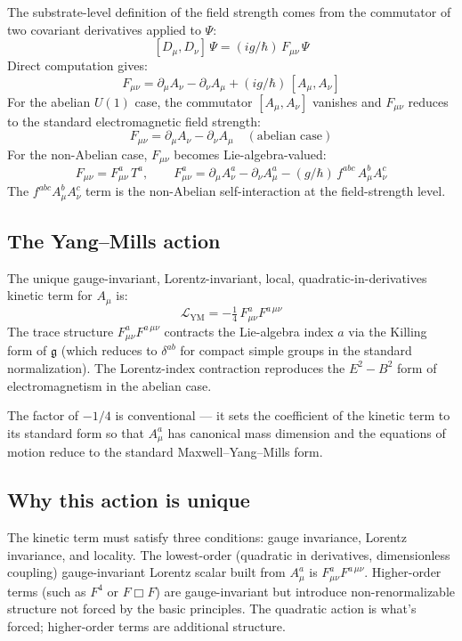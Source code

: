 \documentclass[11pt,a4paper]{article}
\begin{document}
The substrate-level definition of the field strength comes from the commutator of two covariant derivatives applied to $\Psi$:
\[
[D_\mu, D_\nu]\, \Psi = (ig/\hbar)\, F_{\mu\nu}\, \Psi
\]
Direct computation gives:
\[
F_{\mu\nu} = \partial_\mu A_\nu - \partial_\nu A_\mu + (ig/\hbar)\, [A_\mu, A_\nu]
\]
For the abelian $U(1)$ case, the commutator $[A_\mu, A_\nu]$ vanishes and $F_{\mu\nu}$ reduces to the standard electromagnetic field strength:
\[
F_{\mu\nu} = \partial_\mu A_\nu - \partial_\nu A_\mu \quad (\text{abelian case})
\]
For the non-Abelian case, $F_{\mu\nu}$ becomes Lie-algebra-valued:
\[
F_{\mu\nu} = F_{\mu\nu}^a\, T^a, \qquad F_{\mu\nu}^a = \partial_\mu A_\nu^a - \partial_\nu A_\mu^a - (g/\hbar)\, f^{abc}\, A_\mu^b A_\nu^c
\]
The $f^{abc} A_\mu^b A_\nu^c$ term is the non-Abelian self-interaction at the field-strength level.

\subsection{The Yang--Mills action}

The unique gauge-invariant, Lorentz-invariant, local, quadratic-in-derivatives kinetic term for $A_\mu$ is:
\[
\mathcal{L}_{\mathrm{YM}} = -\tfrac{1}{4}\, F_{\mu\nu}^a F^{a\,\mu\nu}
\]
The trace structure $F_{\mu\nu}^a F^{a\,\mu\nu}$ contracts the Lie-algebra index $a$ via the Killing form of $\mathfrak{g}$ (which reduces to $\delta^{ab}$ for compact simple groups in the standard normalization). The Lorentz-index contraction reproduces the $E^2 - B^2$ form of electromagnetism in the abelian case.

The factor of $-1/4$ is conventional --- it sets the coefficient of the kinetic term to its standard form so that $A_\mu^a$ has canonical mass dimension and the equations of motion reduce to the standard Maxwell--Yang--Mills form.

\subsection{Why this action is unique}

The kinetic term must satisfy three conditions: gauge invariance, Lorentz invariance, and locality. The lowest-order (quadratic in derivatives, dimensionless coupling) gauge-invariant Lorentz scalar built from $A_\mu^a$ is $F_{\mu\nu}^a F^{a\,\mu\nu}$. Higher-order terms (such as $F^4$ or $F\Box F$) are gauge-invariant but introduce non-renormalizable structure not forced by the basic principles. The quadratic action is what's forced; higher-order terms are additional structure.
\end{document}
